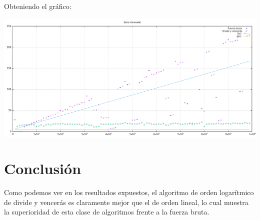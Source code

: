 \documentclass[a4paper, 11pt]{article}
\begin{document}
Obteniendo el gráfico:
\begin{center}
	\includegraphics[scale=0.22]{ajuste.pdf}
\end{center}

\section{Conclusión}
Como podemos ver en los resultados expuestos, el algoritmo de orden logarítmico de divide y vencerás es claramente mejor que el de orden lineal, lo cual muestra la superioridad de esta clase de algoritmos frente a la fuerza bruta.
\end{document}
